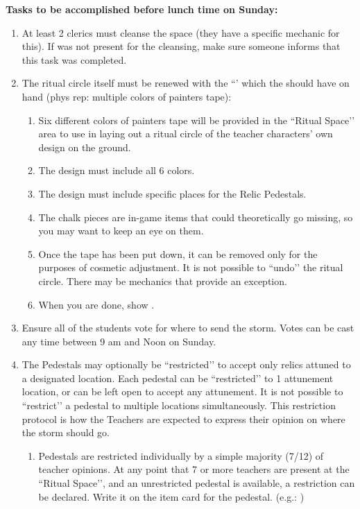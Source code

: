\documentclass[green]{GL2020}
\begin{document}
\textbf{Tasks to be accomplished before lunch time on Sunday:}
\begin{enumerate}
  \item At least 2 clerics must cleanse the space (they have a specific mechanic for this). If \cPrincipal{} was not present for the cleansing, make sure someone informs \cPrincipal{\them} that this task was completed.
  \item The ritual circle itself must be renewed with the ``\iChalk{}’ which the \cPrincipal{} should have on hand (phys rep: multiple colors of painters tape):
  \begin{enumerate}
    \item Six different colors of painters tape will be provided in the ``Ritual Space’’ area to use in laying out a ritual circle of the teacher characters’ own design on the ground. 
    \item The design must include all 6 colors.
    \item The design must include specific places for the Relic Pedestals.
    \item The chalk pieces are in-game items that could theoretically go missing, so you may want to keep an eye on them.
    \item Once the tape has been put down, it can be removed only for the purposes of cosmetic adjustment. It is not possible to ``undo’’ the ritual circle. There may be mechanics that provide an exception.
    \item When you are done, show \cPrincipal{}.
  \end{enumerate}
  \item Ensure all of the students vote for where to send the storm. Votes can be cast any time between 9 am and Noon on Sunday.
    \item The Pedestals may optionally be ``restricted’’ to accept only relics attuned to a designated location. Each pedestal can be ``restricted’’ to 1 attunement location, or can be left open to accept any attunement. It is not possible to ``restrict’’ a pedestal to multiple locations simultaneously. This restriction protocol is how the Teachers are expected to express their opinion on where the storm should go.
\begin{enumerate}
	\item Pedestals are restricted individually by a simple majority (7/12) of teacher opinions. At any point that 7 or more teachers are present at the ``Ritual Space’’, and an unrestricted pedestal is available, a restriction can be declared. Write it on the item card for the pedestal. (e.g.: \pFarm{})

\end{enumerate}
\end{enumerate}
\end{document}
